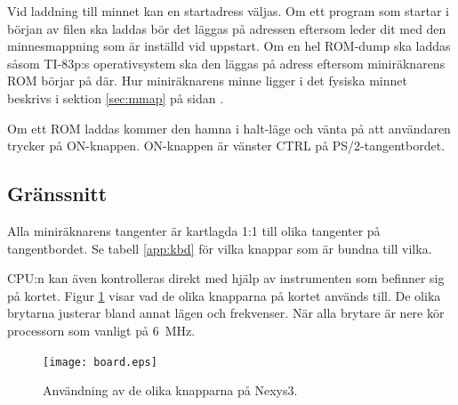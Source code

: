 \documentclass[main.tex]{subfiles}
\begin{document}
Vid laddning till minnet kan en startadress väljas. Om ett program som startar
i början av filen ska laddas bör det läggas på adressen  eftersom
 leder dit med den minnesmappning som är inställd vid uppstart. Om
en hel ROM-dump ska laddas såsom TI-83p:s operativsystem ska den läggas på
adress  eftersom miniräknarens ROM börjar på där. Hur miniräknarens
minne ligger i det fysiska minnet beskrivs i sektion \ref{sec:mmap} på sidan
\pageref{sec:mmap}.

Om ett ROM laddas kommer den hamna i halt-läge och vänta på att användaren
trycker på ON-knappen. ON-knappen är vänster CTRL på PS/2-tangentbordet.

\subsection{Gränssnitt}
Alla miniräknarens tangenter är kartlagda 1:1 till olika tangenter på
tangentbordet. Se tabell \ref{app:kbd} för vilka knappar som är bundna till
vilka.

CPU:n kan även kontrolleras direkt med hjälp av instrumenten som befinner sig
på kortet. Figur \ref{fig:interface} visar vad de olika knapparna på kortet
används till. De olika brytarna justerar bland annat lägen och frekvenser. När
alla brytare är nere kör processorn som vanligt på \SI{6}{\mega\hertz}.

\begin{figure}[b]
    \centering
    \texttt{[image: board.eps]}
    \caption{Användning av de olika knapparna på Nexys3.}
    \label{fig:interface}
\end{figure}
\end{document}
